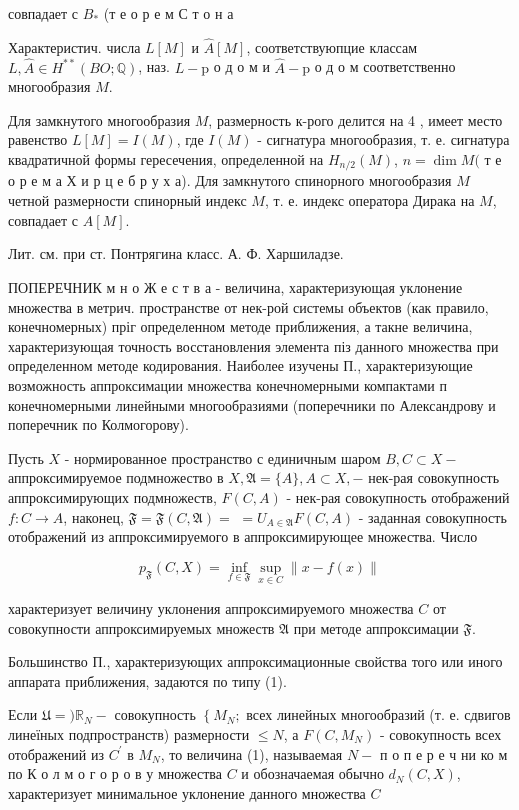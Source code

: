 \documentclass[10pt]{article}
\begin{document}
совпадает с $B_{*}$ (т е о р е м С т о н а



Характеристич. числа $L[M]$ и $\widehat{A}[M]$, соответствуюпцие классам $L, \widehat{A} \in H^{* *}(B O ; \mathbb{Q})$, наз. $L-\mathrm{p}$ о д о м и $\hat{A}-\mathrm{p}$ о д о м соответственно многообразия $M$.



Для замкнутого многообразия $M$, размерность к-рого делится на 4 , имеет место равенство $L[M]=I(M)$, где $I(M)$ - сигнатура многообразия, т. е. сигнатура квадратичной формы гересечения, определенной на $H_{n / 2}(M)$, $n=\operatorname{dim} M($ т е о р е м а Х и р ц е б р у х а). Для замкнутого спинорного многообразия $M$ четной размерности спинорный индекс $M$, т. е. индекс оператора Дирака на $M$, совпадает с $\hat{A}[M]$.



Лит. см. при ст. Понтрягина класс. А. Ф. Харшиладзе.



ПОПЕРЕЧНИК м н о Ж е с т в а - величина, характеризующая уклонение множества в метрич. пространстве от нек-рой системы объектов (как правило, конечномерных) пріг определенном методе приближения, а такне величина, характеризующая точность восстановления элемента піз данного множества при определенном методе кодирования. Наиболее изучены П., характеризующие возможность аппроксимации множества конечномерными компактами п конечномерными линейными многообразиями (поперечники по Александрову и поперечник по Колмогорову).



Пусть $X$ - нормированное пространство с единичным шаром $B, C \subset X-$ аппроксимируемое подмножество в $X, \mathfrak{A}=\{A\}, A \subset X,-$ нек-рая совокупность аппроксимирующих подмножеств, $F(C, A)$ - нек-рая совокупность отображений $f: C \rightarrow A$, наконец, $\mathfrak{F}=\mathfrak{F}(C, \mathfrak{A})=$ $=U_{A \in \mathfrak{A}} F(C, A)$ - заданная совокупность отображений из аппроксимируемого в аппроксимирующее множества. Число



\[

p_{\mathfrak{F}}(C, X)=\inf _{f \in \mathfrak{F}} \sup _{x \in C}\|x-f(x)\|

\]



характеризует величину уклонения аппроксимируемого множества $C$ от совокупности аппроксимируемых множеств $\mathfrak{A}$ при методе аппроксимации $\mathfrak{F}$.



Большинство П., характеризующих аппроксимационные свойства того или иного аппарата приближения, задаются по типу (1).



Если $\mathfrak{U}=\mathfrak{)} \mathbb{R}_{N}-$ совокупность $\left\{M_{N} ;\right.$ всех линейных многообразий (т. е. сдвигов линеїных подпространств) размерности $\leqslant N$, а $F\left(C, M_{N}\right)$ - совокупность всех отображений из $C^{\prime}$ в $M_{N}$, то величина (1), называемая $N-$ п о п е р е ч ни ко м по К о л м о г о р о в у множества $C$ и обозначаемая обычно $d_{N}(C, X)$, характеризует минимальное уклонение данного множества $C$
\end{document}
